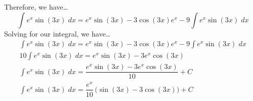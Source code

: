 \documentclass[11pt,letterpaper]{article}
\begin{document}
Therefore, we have\dots
	\[
	\int e^x \sin(3x) \;dx= e^x \sin(3x) - 3 \cos(3x) e^x - 9 \int e^x \sin(3x) \;dx
	\]
Solving for our integral, we have\dots
	\[
	\begin{gathered}
	\int e^x \sin(3x) \;dx= e^x \sin(3x) - 3 \cos(3x) e^x - 9 \int e^x \sin(3x) \;dx \\[0.2cm]
	10 \int e^x \sin(3x) \;dx= e^x \sin(3x) - 3 e^x \cos(3x) \\[0.2cm]
	\int e^x \sin(3x) \;dx= \dfrac{e^x \sin(3x) - 3 e^x \cos(3x)}{10} + C \\[0.2cm]
	\int e^x \sin(3x) \;dx= \dfrac{e^x}{10} \,\big( \sin(3x) - 3 \cos(3x) \big) + C
	\end{gathered}
	\]
\end{document}
